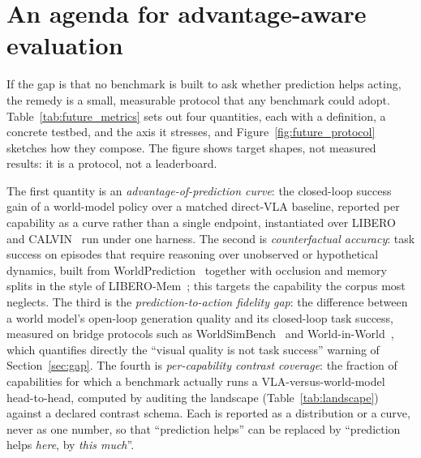 \section{An agenda for advantage-aware evaluation}
\label{sec:future}

If the gap is that no benchmark is built to ask whether prediction helps acting, the remedy is a
small, measurable protocol that any benchmark could adopt. Table~\ref{tab:future_metrics} sets out
four quantities, each with a definition, a concrete testbed, and the axis it stresses, and
Figure~\ref{fig:future_protocol} sketches how they compose. The figure shows target shapes, not
measured results: it is a protocol, not a leaderboard.

The first quantity is an \emph{advantage-of-prediction curve}: the closed-loop success gain of a
world-model policy over a matched direct-VLA baseline, reported per capability as a curve rather than
a single endpoint, instantiated over LIBERO~\cite{libero} and CALVIN~\cite{calvin} run under one
harness. The second is \emph{counterfactual accuracy}: task success on episodes that require
reasoning over unobserved or hypothetical dynamics, built from WorldPrediction~\cite{worldprediction}
together with occlusion and memory splits in the style of LIBERO-Mem~\cite{liberomem}; this targets
the capability the corpus most neglects. The third is the \emph{prediction-to-action fidelity gap}:
the difference between a world model's open-loop generation quality and its closed-loop task success,
measured on bridge protocols such as WorldSimBench~\cite{worldsimbench} and
World-in-World~\cite{worldinworld}, which quantifies directly the ``visual quality is not task
success'' warning of Section~\ref{sec:gap}. The fourth is \emph{per-capability contrast coverage}:
the fraction of capabilities for which a benchmark actually runs a VLA-versus-world-model head-to-head,
computed by auditing the landscape (Table~\ref{tab:landscape}) against a declared contrast schema.
Each is reported as a distribution or a curve, never as one number, so that ``prediction helps'' can
be replaced by ``prediction helps \emph{here}, by \emph{this much}''.




\FloatBarrier
